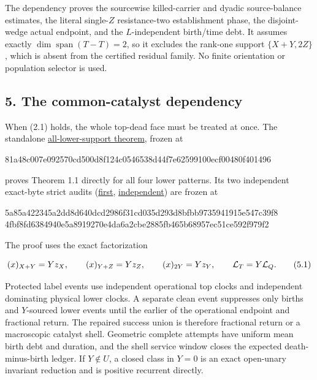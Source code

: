 The dependency proves the sourcewise killed-carrier and dyadic
source-balance estimates, the literal single-\(Z\) resistance-two
establishment phase, the disjoint-wedge actual endpoint, and the
\(L\)-independent birth/time debt. It assumes exactly
\(\dim\operatorname{span}(T-T)=2\), so it excludes the rank-one support
\(\{X+Y,2Z\}\), which is absent from the certified residual family. No
finite orientation or population selector is used.

\subsection{5. The common-catalyst
dependency}

When (2.1) holds, the whole top-dead face must be treated at once. The
standalone
\href{proof_first_h111_common_catalyst_all_lower_supports_theorem.md}{all-lower-support
theorem}, frozen at

\begin{CodeBlock}
81a48c007e092570cd500d8f124c0546538d44f7e62599100ecf00480f401496
\end{CodeBlock}

proves Theorem 1.1 directly for all four lower patterns. Its two
independent exact-byte strict audits
(\href{proof_first_h111_common_catalyst_all_lower_supports_exact_byte_audit.md}{first},
\href{proof_first_h111_common_catalyst_all_lower_supports_independent_exact_byte_audit.md}{independent})
are frozen at

\begin{CodeBlock}
5a85a422345a2dd8d640dcd2986f31cd035d293d8bfbb9735941915e547c39f8
4fbf8fd6384940e5a8919270e4da6a2cbe2885fb465b68957ec51ce592f979f2
\end{CodeBlock}

The proof uses the exact factorization

\[
 (x)_{X+Y}=Yz_X,\qquad (x)_{Y+Z}=Yz_Z,\qquad
 (x)_{2Y}=Yz_Y,\qquad {\cal L}_T=Y{\cal L}_Q.        \tag{5.1}
\]

Protected label events use independent operational top clocks and
independent dominating physical lower clocks. A separate clean event
suppresses only births and \(Y\)-sourced lower events until the earlier
of the operational endpoint and fractional return. The repaired success
union is therefore fractional return or a macroscopic catalyst shell.
Geometric complete attempts have uniform mean birth debt and duration,
and the shell service window closes the expected death-minus-birth
ledger. If \(Y\notin U\), a closed class in \(Y=0\) is an exact
open-unary invariant reduction and is positive recurrent directly.

